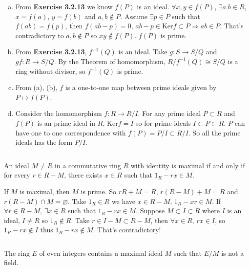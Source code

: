 \begin{answer}
    \begin{enumerate}[(a)]
        \item From \textbf{Exercise 3.2.13} we know $f(P)$ is an ideal. $\forall x,y\in f(P)$, $\exists a.b\in R$, $x=f(a)$, $y=f(b)$ and $a,b\notin P$. Assume $\exists p\in P$ such that $f(ab)=f(p)$, then $f(ab-p)=0$, $ab-p\in\mathrm{Ker}f\subset P\Rightarrow ab\in P$. That's contradictory to $a,b\notin P$ so $xy\notin f(P)$. $f(P)$ is prime.
        \item From \textbf{Exercise 3.2.13}, $f^{-1}(Q)$ is an ideal. Take $g:S\to S /Q$ and $gf:R\to S /Q$. By the Theorem of homomorphism, $R /f^{-1}(Q) \cong S /Q$ is a ring without divisor, so $f^{-1}(Q)$ is prime.
        \item From (a), (b), $f$ is a one-to-one map between prime ideals given by $P\mapsto f(P)$.
        \item Consider the homomorphism $f:R\to R /I$. For any prime ideal $P\subset R$ and $f(P)$ is an prime ideal in $R$, $\mathrm{Ker}f=I$ so for prime ideals $I\subset P\subset R$. $P$ can have one to one correspondence with $f(P)=P /I\subset R/I$. So all the prime ideals has the form $P /I$.
    \end{enumerate}
\end{answer}

$$ $$

\begin{ex}
    An ideal $M\neq R$ in a commutative ring $R$ with identity is maximal if and only if for every $r\in R-M$, there exists $x\in R$ such that $1_{R}-rx\in M$.
\end{ex}

\begin{answer}
    If $M$ is maximal, then $M$ is prime. So $rR+M=R$, $r(R-M)+M=R$ and $r(R-M)\cap M=\varnothing$. Take $1_{R}\in R$ we have $x\in R-M$, $1_{R}-xr\in M$. If $\forall r\in R-M$, $\exists x\in R$ such that $1_{R}-rx\in M$. Suppose $M\subset I\subset R$ where $I$ is an ideal, $I\neq R$ so $1_{R}\notin R$. Take $r\in I-M\subset R-M$, then $\forall x\in R$, $rx\in I$, so $1_{R}-rx\notin I$ thus $1_{R}-rx\notin M$. That's contradictory!
\end{answer}

$$ $$

\begin{ex}
    The ring $E$ of even integers contains a maximal ideal $M$ such that $E /M$ is not a field.
\end{ex}

